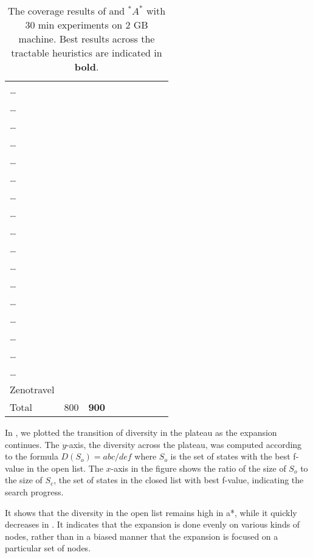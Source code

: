 {\begin{table}[htb]
\begin{tabular}{l|ll|ll||ll|ll|}
\ldots{} &  &  &  &  &  &  &  & \\
\ldots{} &  &  &  &  &  &  &  & \\
\ldots{} &  &  &  &  &  &  &  & \\
\ldots{} &  &  &  &  &  &  &  & \\
\ldots{} &  &  &  &  &  &  &  & \\
\ldots{} &  &  &  &  &  &  &  & \\
\ldots{} &  &  &  &  &  &  &  & \\
\ldots{} &  &  &  &  &  &  &  & \\
\ldots{} &  &  &  &  &  &  &  & \\
\ldots{} &  &  &  &  &  &  &  & \\
\ldots{} &  &  &  &  &  &  &  & \\
\ldots{} &  &  &  &  &  &  &  & \\
\ldots{} &  &  &  &  &  &  &  & \\
\ldots{} &  &  &  &  &  &  &  & \\
\ldots{} &  &  &  &  &  &  &  & \\
\ldots{} &  &  &  &  &  &  &  & \\
\ldots{} &  &  &  &  &  &  &  & \\
Zenotravel &  &  &  &  &  &  &  & \\
\hline
Total & 800 & \textbf{900} &  &  &  &  &  & \\
\end{tabular}
\caption{The coverage results of \astar and $^*A^*$ with 30 min experiments on 2 GB machine. Best results across the tractable heuristics are indicated in \textbf{bold}.}
\label{tbl:main}
\end{table}

}

In , we plotted the transition of diversity in the plateau as the expansion continues. The $y$-axis, the diversity across the plateau, was computed according to the formula $D(S_o)=abc/def$ where $S_o$ is the set of states with the best f-value in the open list. The $x$-axis in the figure shows the ratio of the size of $S_o$ to the size of $S_c$, the set of states in the closed list with best f-value, indicating the search progress.

It shows that the diversity in the open list remains high in \*a*, while it quickly decreases in \astar. It indicates that the expansion is done evenly on various kinds of nodes, rather than in a biased manner that the expansion is focused on a particular set of nodes. 

